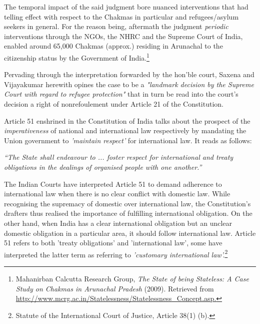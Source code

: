 \begin{multicols}{2}
\noi
The temporal impact of the said judgment bore nuanced interventions that had telling effect
with respect to the Chakmas in particular and refugees/asylum seekers in general. For the
reason being, aftermath the judgment \textit{periodic} interventions through the NGOs, the NHRC
and the Supreme Court of India, enabled around 65,000 Chakmas (approx.) residing in
Arunachal to the citizenship status by the Government of India.\footnote{Mahanirban Calcutta Research Group, \textit{The State of being Stateless: A Case Study on Chakmas in Arunachal Pradesh} (2009). Retrieved from \url{http://www.mcrg.ac.in/Statelessness/Statelessness_Concept.asp.}}

\noi
Pervading through the interpretation forwarded by the hon’ble court, Saxena and
Vijayakumar herewith opines the case to be a  \textit{"landmark decision by the Supreme Court with
regard to refugee protection"} that in turn be read into the court's decision a right of nonrefoulement under Article 21 of the Constitution.


\noi
Article 51 enshrined in the Constitution of India talks about the prospect of the
\textit{imperativeness} of national and international law respectively by mandating the Union
government to \textit{'maintain respect'} for international law. It reads as follows:

\noi
\textit{“The State shall endeavour to ... foster respect for international and treaty obligations in
the dealings of organised people with one another.”}

\noi
The Indian Courts have interpreted Article 51 to demand adherence to international law when
there is no clear conflict with domestic law. While recognising the supremacy of domestic
over international law, the Constitution's drafters thus realised the importance of fulfilling
international obligation. On the other hand, when India has a clear international obligation
but an unclear domestic obligation in a particular area, it should follow international law.
Article 51 refers to both 'treaty obligations' and 'international law', some have interpreted the
latter term as referring to \textit{'customary international law'.}\footnote{Statute of the International Court of Justice, Article 38(1) (b).}



\end{multicols}
